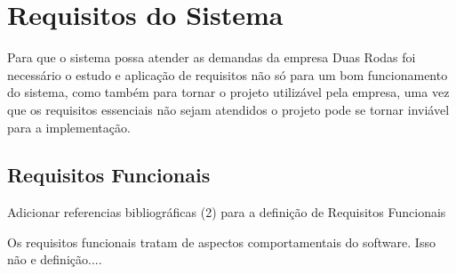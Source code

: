 \chapter{Requisitos do Sistema}

Para que o sistema possa atender as demandas da  empresa Duas Rodas foi necessário o estudo e aplicação  de requisitos não só para um bom funcionamento do sistema, como também para tornar o projeto utilizável pela empresa, uma vez que os requisitos essenciais não sejam atendidos o projeto pode se tornar inviável para a implementação.


\section{Requisitos Funcionais}

 
{\color{red} Adicionar referencias bibliográficas (2) para a definição de Requisitos Funcionais	
	
Os requisitos funcionais tratam de aspectos comportamentais do software.\cite{alvarenga2007abordagem}  Isso não e definição....

}


